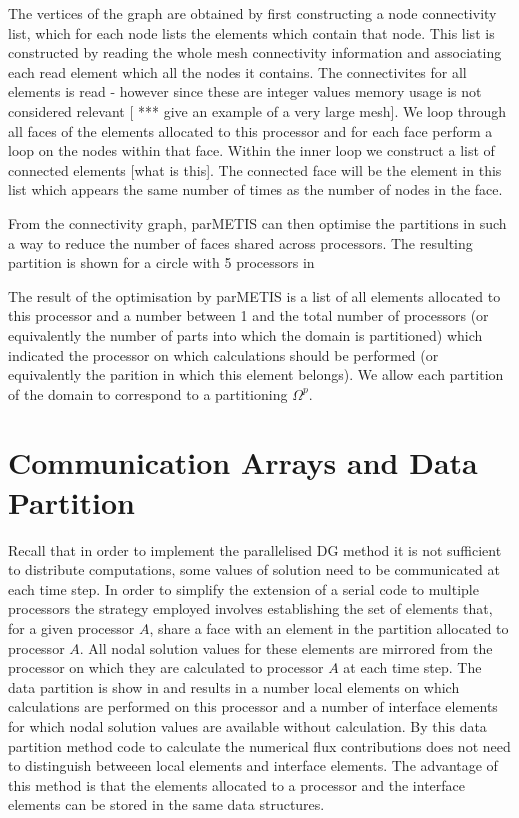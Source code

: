 The vertices of the graph are obtained by first constructing a node connectivity list, which for each node lists the elements which contain that node. This list is constructed by reading the whole mesh connectivity information and associating each read element which all the nodes it contains. The connectivites for all elements is read - however since these are integer values memory usage is not considered relevant [ *** give an example of a very large mesh]. We loop through all faces of the elements allocated to this processor and for each face perform a loop on the nodes within that face. Within the inner loop we construct a list of connected elements [what is this]. The connected face will be the element in this list which appears the same number of times as the number of nodes in the face.

From the connectivity graph, parMETIS can then optimise the partitions in such a way to reduce the number of faces shared across processors. The resulting partition is shown for a circle with 5 processors in 

The result of the optimisation by parMETIS is a list of all elements allocated to this processor and a number between 1 and the total number of processors (or equivalently the number of parts into which the domain is partitioned) which indicated the processor on which calculations should be performed (or equivalently the parition in which this element belongs). We allow each partition of the domain to correspond to a partitioning $\Omega^p$.

\section{Communication Arrays and Data Partition}

Recall that in order to implement the parallelised DG method it is not sufficient to distribute computations, some values of solution need to be communicated at each time step. In order to simplify the extension of a serial code to multiple processors the strategy employed involves establishing the set of elements that, for a given processor $A$, share a face with an element in the partition allocated to processor $A$. All nodal solution values for these elements are mirrored from the processor on which they are calculated to processor $A$ at each time step. The data partition is show in  and results in a number local elements on which calculations are performed on this processor and a number of interface elements for which nodal solution values are available without calculation. By this data partition method code to calculate the numerical flux contributions does not need to distinguish betweeen local elements and interface elements. The advantage of this method is that the elements allocated to a processor and the interface elements can be stored in the same data structures.

